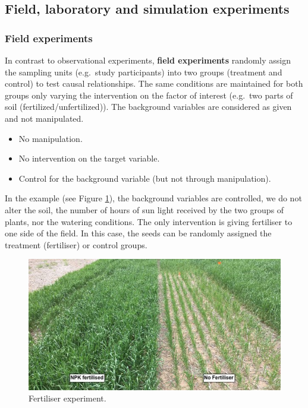 \documentclass[
]{book}
\providecommand{\tightlist}{%
  \setlength{\itemsep}{0pt}\setlength{\parskip}{0pt}}
\begin{document}
\hypertarget{field-laboratory-and-simulation-experiments}{%
\subsection{Field, laboratory and simulation experiments}\label{field-laboratory-and-simulation-experiments}}

\hypertarget{field-experiments}{%
\subsubsection{Field experiments}\label{field-experiments}}

In contrast to observational experiments, \textbf{field experiments} randomly assign the sampling units (e.g.~study participants) into two groups (treatment and control) to test causal relationships. The same conditions are maintained for both groups only varying the intervention on the factor of interest (e.g.~two parts of soil (fertilized/unfertilized)). The background variables are considered as given and not manipulated.

\begin{itemize}
\tightlist
\item
  No manipulation.
\item
  No intervention on the target variable.
\item
  Control for the background variable (but not through manipulation).
\end{itemize}

In the example (see Figure \ref{fig:fertiliser}), the background variables are controlled, we do not alter the soil, the number of hours of sun light received by the two groups of plants, nor the watering conditions. The only intervention is giving fertiliser to one side of the field. In this case, the seeds can be randomly assigned the treatment (fertiliser) or control groups.

\begin{figure}

{\centering \includegraphics[width=0.66\linewidth]{Figures/crop} 

}

\caption{Fertiliser experiment.}\label{fig:fertiliser}
\end{figure}
\end{document}
